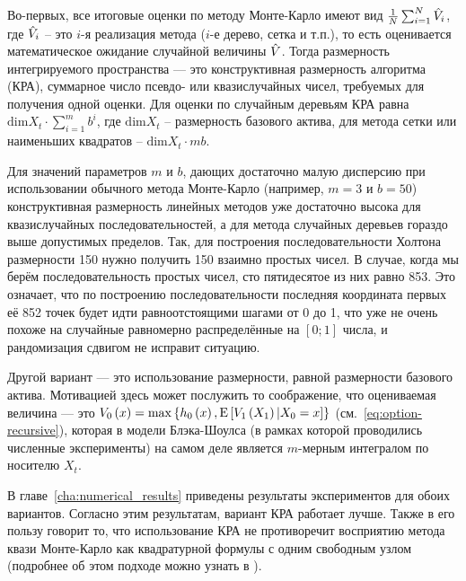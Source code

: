 Во-первых, все итоговые оценки по методу Монте-Карло имеют вид $\frac{1}{N}\sum_{i=1}^N \hat{V}_i$, где $\hat{V}_i$ -- это $i$-я реализация метода ($i$-е дерево, сетка и т.п.), то есть оценивается математическое ожидание случайной величины $\hat{V}$. Тогда размерность интегрируемого пространства --- это конструктивная размерность алгоритма (КРА), суммарное число псевдо- или квазислучайных чисел, требуемых для получения одной оценки. Для оценки по случайным деревьям КРА равна $\mathrm{dim} X_t \cdot \sum_{i=1}^m b^i$, где $\mathrm{dim} X_t$ -- размерность базового актива, для метода сетки или наименьших квадратов -- $\mathrm{dim} X_t \cdot mb$.

Для значений параметров $m$ и $b$, дающих достаточно малую дисперсию при использовании обычного метода Монте-Карло (например, $m = 3$ и $b = 50$) конструктивная размерность линейных методов уже достаточно высока для квазислучайных последовательностей, а для метода случайных деревьев гораздо выше допустимых пределов. Так, для построения последовательности Холтона размерности 150 нужно получить 150 взаимно простых чисел. В случае, когда мы берём последовательность простых чисел, сто пятидесятое из них равно 853. Это означает, что по построению последовательности последняя координата первых её 852 точек будет идти равноотстоящими шагами от 0 до 1, что уже не очень похоже на случайные равномерно распределённые на $\left[0; 1\right]$ числа, и рандомизация сдвигом не исправит ситуацию.

Другой вариант --- это использование размерности, равной размерности базового актива. Мотивацией здесь может послужить то соображение, что оцениваемая величина --- это $V_0\left(x\right) = \max\left\lbrace h_0\left(x\right),\mathrm{E}\left[V_1\left(X_1\right)|X_0=x\right]\right\rbrace$ (см.~\eqref{eq:option-recursive}), которая в модели Блэка-Шоулса (в рамках которой проводились численные эксперименты) на самом деле является $m$-мерным интегралом по носителю $X_t$.

В главе~\ref{cha:numerical_results} приведены результаты экспериментов для обоих вариантов. Согласно этим результатам, вариант КРА работает лучше. Также в его пользу говорит то, что использование КРА не противоречит восприятию метода квази Монте-Карло как квадратурной формулы с одним свободным узлом (подробнее об этом подходе можно узнать в \cite{montekarlo1975}).


